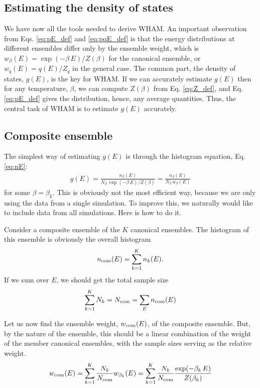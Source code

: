 \documentclass[aip,jcp,preprint,superscriptaddress]{revtex4-1}
\begin{document}
\subsection{Estimating the density of states}


We have now all the tools needed to derive WHAM.
%
An important observation from
Eqs. \eqref{eq:pE_def} and \eqref{eq:pqE_def}
is that
the energy distributions at different ensembles
differ only by the ensemble weight,
which is $w_\beta(E) = \exp(-\beta \, E) / Z(\beta)$
for the canonical ensemble,
or $w_q(E) = q(E)/Z_q$ in the general case.
%
The common part, the density of states,
$g(E)$, is the key for WHAM.
%
If we can accurately estimate $g(E)$
then for any temperature, $\beta$,
we can compute $Z(\beta)$ from Eq. \eqref{eq:Z_def},
and Eq. \eqref{eq:pE_def} gives the distribution,
hence, any average quantities.
%
Thus,
the central task of WHAM
is to estimate $g(E)$ accurately.




\subsection{Composite ensemble}



The simplest way
of estimating $g(E)$ is through the histogram equation,
Eq. \eqref{eq:nE}:
%
\begin{align}
\hat g(E)
=
\frac{ n_\beta(E) }
{ N_\beta \, \exp(-\beta \, E) / Z(\beta) }
=
\frac{ n_\beta(E) }
{ N_\beta \, w_\beta(E) }
\label{eq:gE_onehistogram}
\end{align}
for some $\beta = \beta_k$.
%
This is obviously not the most efficient way,
because we are only using the data
from a single simulation.
%
To improve this,
we naturally would like to include data
from all simulations.
%
Here is how to do it.



Consider a composite ensemble
of the $K$ canonical ensembles.
%
The histogram of this ensemble
is obviously the overall histogram
%
\begin{equation}
  n_{\mathrm{com}}(E)
=
  \sum_{k = 1}^K n_k(E).
  \label{eq:ncom_def}
\end{equation}
%
If we sum over $E$,
we should get the total sample size
%
\begin{equation}
 \sum_{k = 1}^K N_k
= N_{\mathrm{com}}
= \sum_E n_{\mathrm{com}}(E)
\label{eq:ncom_sum}
\end{equation}
%


Let us now find the ensemble weight, $w_{\mathrm{com}}(E)$,
of the composite ensemble.
%
But, by the nature of the ensemble,
this should be a linear combination
of the weight of the member canonical ensembles,
with the sample sizes serving as the relative weight.
%
\begin{equation}
w_{\mathrm{com}}(E)
=
\sum_{k = 1}^K
\frac{ N_k } { N_{\mathrm{com}} }
w_{\beta_k}(E)
=
\sum_{k = 1}^K
\frac{ N_k } { N_{\mathrm{com}} }
\frac{ \exp( -\beta_k \, E ) } { Z(\beta_k) }
\end{equation}
\end{document}

